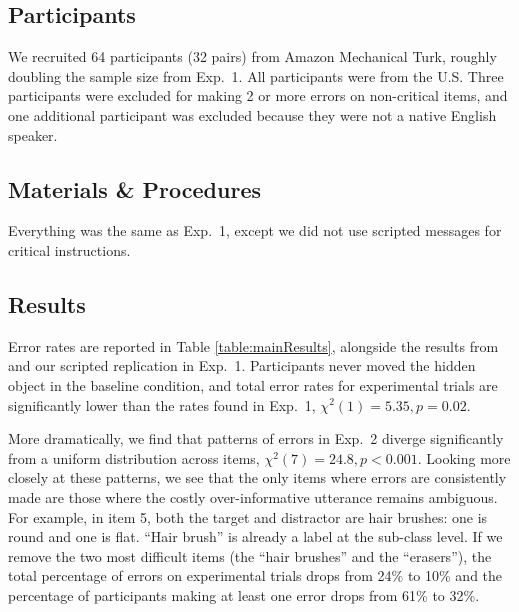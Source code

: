 \documentclass[10pt,letterpaper]{article}
\begin{document}
\subsection{Participants}

We recruited 64 participants (32 pairs) from Amazon Mechanical Turk, roughly doubling the sample size from Exp.~1. All participants were from the U.S. Three participants were excluded for making 2 or more errors on non-critical items, and one additional participant was excluded because they were not a native English speaker.

\subsection{Materials \& Procedures}

Everything was the same as Exp.~1, except we did not use scripted messages for critical instructions. 
 



\subsection{Results}

Error rates are reported in Table \ref{table:mainResults}, alongside the results from  and our scripted replication in Exp.~1. Participants never moved the hidden object in the baseline condition, and total error rates for experimental trials are significantly lower than the rates found in Exp.~1, $\chi^2(1) = 5.35, p = 0.02$.

More dramatically, we find that patterns of errors in Exp.~2 diverge significantly from a uniform distribution across items, $\chi^2(7) = 24.8, p < 0.001$. Looking more closely at these patterns, we see that the only items where errors are consistently made are those where the costly over-informative utterance remains ambiguous. For example, in item 5, both the target and distractor are hair brushes: one is round and one is flat. ``Hair brush'' is already a label at the sub-class level. If we remove the two most difficult items (the ``hair brushes'' and the ``erasers''), the total percentage of errors on experimental trials drops from 24\% to 10\% and the percentage of participants making at least one error drops from 61\% to 32\%.
\end{document}
